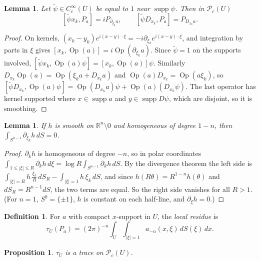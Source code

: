 \documentclass[11pt,oneside,reqno]{article}
\DeclareMathOperator{\supp}{supp}
\DeclareMathOperator{\Op}{Op}
\newcommand{\R}{\mathbb R}
\newcommand{\cP}{\mathcal P}
\newcommand{\CI}{C^\infty}
\newcommand{\pa}{\partial}
\theoremstyle{plain}
\newtheorem{proposition}[theorem]{Proposition}
\newtheorem{lemma}[theorem]{Lemma}
\theoremstyle{definition}
\newtheorem{definition}[theorem]{Definition}
\theoremstyle{remark}
\begin{document}
\begin{lemma}\label{lem:xDcomm}
Let \(\tilde\psi\in\CI_c(U)\) be equal to \(1\) near \(\supp\psi\). Then in \(\cP_c(U)\)
\[
 [\tilde\psi x_k,P_a]=iP_{\pa_{\xi_k}a},\qquad[\tilde\psi D_{x_k},P_a]=P_{D_{x_k}a}.
\]
\end{lemma}

\begin{proof}
On kernels, \((x_k-y_k)e^{i(x-y)\cdot\xi}=-i\pa_{\xi_k}e^{i(x-y)\cdot\xi}\), and integration by
parts in \(\xi\) gives \([x_k,\Op(a)]=i\Op(\pa_{\xi_k}a)\). Since \(\tilde\psi=1\) on the supports
involved, \([\tilde\psi x_k,\Op(a)\psi]=[x_k,\Op(a)]\psi\). Similarly
\(D_{x_k}\Op(a)=\Op(\xi_ka+D_{x_k}a)\) and \(\Op(a)D_{x_k}=\Op(a\xi_k)\), so
\([\tilde\psi D_{x_k},\Op(a)\psi]=\Op(D_{x_k}a)\psi+\Op(a)(D_{x_k}\psi)\). The last operator has
kernel supported where \(x\in\supp a\) and \(y\in\supp D\psi\), which are disjoint, so it is
smoothing.
\end{proof}

\begin{lemma}\label{lem:divergence}
If \(h\) is smooth on \(\R^n\setminus0\) and homogeneous of degree \(1-n\), then
\(\int_{S^{n-1}}\pa_{\xi_k}h\,dS=0\).
\end{lemma}

\begin{proof}
\(\pa_kh\) is homogeneous of degree \(-n\), so in polar coordinates
\(\int_{1\le|\xi|\le R}\pa_kh\,d\xi=\log R\int_{S^{n-1}}\pa_kh\,dS\). By the divergence theorem the
left side is \(\int_{|\xi|=R}h\,\frac{\xi_k}{R}\,dS_R-\int_{|\xi|=1}h\,\xi_k\,dS\), and since
\(h(R\theta)=R^{1-n}h(\theta)\) and \(dS_R=R^{n-1}dS\), the two terms are equal. So the right side
vanishes for all \(R>1\). (For \(n=1\), \(S^0=\{\pm1\}\), \(h\) is constant on each half-line, and
\(\pa_\xi h=0\).)
\end{proof}

\begin{definition}
For \(a\) with compact \(x\)-support in \(U\), the \emph{local residue} is
\[
 \tau_U(P_a)=(2\pi)^{-n}\int_U\int_{|\xi|=1}a_{-n}(x,\xi)\,dS(\xi)\,dx .
\]
\end{definition}

\begin{proposition}\label{prop:localtrace}
\(\tau_U\) is a trace on \(\cP_c(U)\).
\end{proposition}
\end{document}
